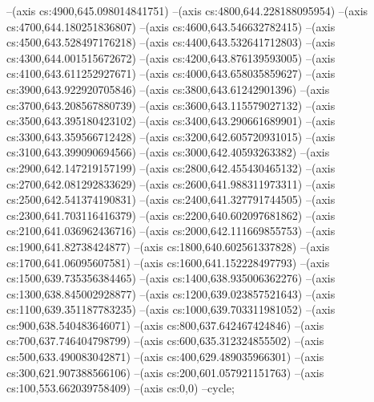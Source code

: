 --(axis cs:4900,645.098014841751)
--(axis cs:4800,644.228188095954)
--(axis cs:4700,644.180251836807)
--(axis cs:4600,643.546632782415)
--(axis cs:4500,643.528497176218)
--(axis cs:4400,643.532641712803)
--(axis cs:4300,644.001515672672)
--(axis cs:4200,643.876139593005)
--(axis cs:4100,643.611252927671)
--(axis cs:4000,643.658035859627)
--(axis cs:3900,643.922920705846)
--(axis cs:3800,643.61242901396)
--(axis cs:3700,643.208567880739)
--(axis cs:3600,643.115579027132)
--(axis cs:3500,643.395180423102)
--(axis cs:3400,643.290661689901)
--(axis cs:3300,643.359566712428)
--(axis cs:3200,642.605720931015)
--(axis cs:3100,643.399090694566)
--(axis cs:3000,642.40593263382)
--(axis cs:2900,642.147219157199)
--(axis cs:2800,642.455430465132)
--(axis cs:2700,642.081292833629)
--(axis cs:2600,641.988311973311)
--(axis cs:2500,642.541374190831)
--(axis cs:2400,641.327791744505)
--(axis cs:2300,641.703116416379)
--(axis cs:2200,640.602097681862)
--(axis cs:2100,641.036962436716)
--(axis cs:2000,642.111669855753)
--(axis cs:1900,641.82738424877)
--(axis cs:1800,640.602561337828)
--(axis cs:1700,641.06095607581)
--(axis cs:1600,641.152228497793)
--(axis cs:1500,639.735356384465)
--(axis cs:1400,638.935006362276)
--(axis cs:1300,638.845002928877)
--(axis cs:1200,639.023857521643)
--(axis cs:1100,639.351187783235)
--(axis cs:1000,639.703311981052)
--(axis cs:900,638.540483646071)
--(axis cs:800,637.642467424846)
--(axis cs:700,637.746404798799)
--(axis cs:600,635.312324855502)
--(axis cs:500,633.490083042871)
--(axis cs:400,629.489035966301)
--(axis cs:300,621.907388566106)
--(axis cs:200,601.057921151763)
--(axis cs:100,553.662039758409)
--(axis cs:0,0)
--cycle;


